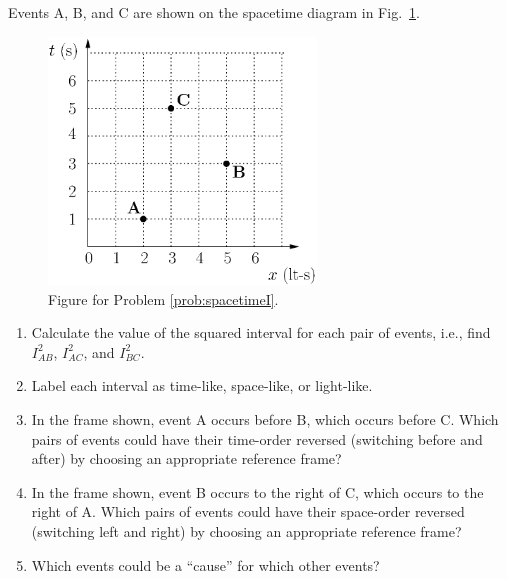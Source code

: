 \begin{problem}
  Events A, B, and C are shown on the spacetime diagram in
  Fig.~\ref{fig:spacetimeI}.
  \begin{figure}[h]
  \begin{center}
    \includegraphics[width=2.8in]{relativistic_spacetime/p_spacetimeI.eps}
  \caption{Figure for Problem \ref{prob:spacetimeI}.}
  \label{fig:spacetimeI}
  \end{center}
  \end{figure}
  \begin{enumerate}
  \item Calculate the value of the squared interval for each pair of
    events, i.e., find $I^2_{AB}$, $I^2_{AC}$, and $I^2_{BC}$.  
  \item Label each interval as time-like, space-like, or light-like.  
  \item In the frame shown, event A occurs before B, which occurs before
    C.  Which pairs of events could have their time-order reversed
    (switching before and after) by choosing an appropriate reference
    frame?  
  \item In the frame shown, event B occurs to the right of C, which
    occurs to the right of A.  Which pairs of events could have their
    space-order reversed (switching left and right) by choosing an
    appropriate reference frame?  
  \item Which events could be a ``cause'' for which other events?
  \end{enumerate}
\label{prob:spacetimeI}
\end{problem}

